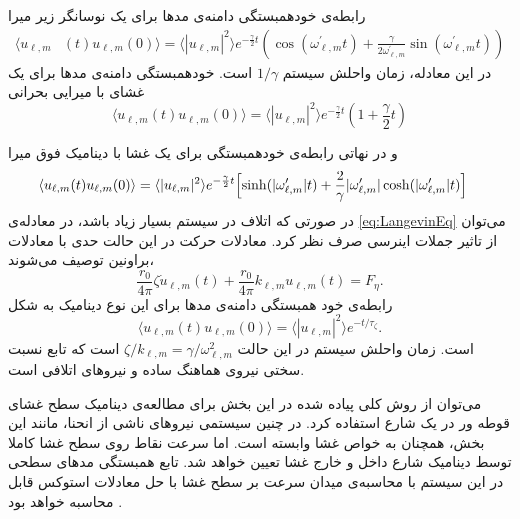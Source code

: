 رابطه‌ی خودهمبستگی
دامنه‌ی مدها برای یک نوسانگر زیر میرا
\begin{equation}
\begin{aligned}
\langle u_{\ell,m}&(t)u_{\ell,m}(0)\rangle=\langle |u_{\ell,m}|^2\rangle e^{-\frac{\gamma}{2}t}\left( \cos(\omega_{\ell,m}^\prime t)+\frac{\gamma}{2\omega_{\ell,m}^\prime}\sin(\omega_{\ell,m}^\prime t)\right)
\end{aligned}
\label{eq:autoUnderDamped}
\end{equation}
در این معادله، زمان واحلش سیستم 
$1/\gamma$
است. خودهمبستگی دامنه‌ی مدها برای یک غشای با میرایی بحرانی
\begin{equation}
\langle u_{\ell,m}(t)u_{\ell,m}(0)\rangle=\langle |u_{\ell,m}|^2\rangle e^{-\frac{\gamma}{2}t}\left(1+\frac{\gamma}{2}t\right)
\label{eq:autoCriticallyDamped}
\end{equation}

و در نهاتی رابطه‌ی خودهمبستگی برای یک غشا با دینامیک فوق میرا
\begin{equation}
\begin{aligned}
\langle u_{\ell,m}&(t)u_{\ell,m}(0)\rangle=\langle |u_{\ell,m}|^2\rangle e^{-\frac{\gamma}{2}t}\Bigl[\sinh(|\omega_{\ell,m}^\prime|t)+\frac{2}{\gamma}|\omega_{\ell,m}^\prime|\cosh(|\omega_{\ell,m}^\prime|t)\Bigr]
\end{aligned}
\label{eq:autoOverDamped}
\end{equation}
در صورتی که اتلاف در سیستم بسیار زیاد باشد، در معادله‌ی
\ref{eq:LangevinEq}
می‌توان از تاثیر جملات اینرسی صرف نظر کرد. معادلات حرکت در این حالت حدی با معادلات براونین توصیف می‌شوند،
\begin{equation}
\frac{r_0}{4\pi}\zeta \dot{u}_{\ell,m}(t)+\frac{r_0}{4\pi}k_{\ell,m}u_{\ell,m}(t)= F_{\eta}.
\label{eq:BrowninaMode}
\end{equation}
رابطه‌ی خود همبستگی دامنه‌ی مد‌ها برای این نوع دینامیک به شکل 
\begin{equation}
\langle u_{\ell,m}(t)u_{\ell,m}(0)\rangle= \langle|u_{\ell,m}|^2\rangle e^{-t/\tau_\zeta}.
\label{eq:BrowninaModeAuto}
\end{equation}
است. زمان واحلش سیستم در این حالت 
$\zeta/k_{\ell,m}=\gamma/\omega_{\ell,m}^2$
است که تابع نسبت سختی نیروی هماهنگ ساده و نیرو‌های اتلافی است.

می‌توان از روش کلی پیاده شده در این بخش برای مطالعه‌ی دینامیک سطح غشای قوطه ور در یک شارع استفاده کرد. در چنین سیستمی نیرو‌های ناشی از انحنا، مانند این بخش، همچنان به خواص غشا وابسته است. اما سرعت نقاط روی سطح غشا کاملا توسط دینامیک شارع داخل و خارج غشا تعیین خواهد شد. تابع همبستگی مد‌های سطحی در این سیستم 
\cite{milnersafranPRA1987}
با محاسبه‌ی میدان سرعت بر سطح غشا با حل معادلات استوکس قابل محاسبه خواهد بود
\cite{Christer1984}
.





